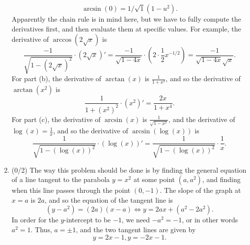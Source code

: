 \documentclass{article}
\begin{document}
\begin{enumerate}
		\[
			\operatorname{arcsin}(0) = 1/\sqrt{1} (1 - u^{2}).
		\]
		Apparently the chain rule is in mind here, but we have to fully compute the derivatives first, and then evaluate them at specific values. For example, the derivative of $\operatorname{arccos}(2 \sqrt{x})$ is 
		\[
			\frac{-1}{\sqrt{1 - (2 \sqrt{x})^{2}}} \cdot (2 \sqrt{x})' = \frac{-1}{\sqrt{1 - 4x}} \cdot (2 \cdot \frac{1}{2} x^{-1/2}) = \frac{-1}{\sqrt{1 - 4x}\sqrt{x}}.
		\]
		For part (b), the derivative of $\operatorname{arctan}(x)$ is $\frac{1}{1+x^{2}}$, and so the derivative of $\operatorname{arctan}(x^{2})$ is
		\[
			\frac{1}{1 + (x^{2})^{2}} \cdot (x^{2})' = \frac{2x}{1 + x^{4}}.
		\]
		For part (c), the derivative of $\operatorname{arcsin}(x)$ is $\frac{1}{\sqrt{1-x^{2}}}$, and the derivative of $\log(x) = \frac{1}{x}$, and so the derivative of $\operatorname{arcsin}(\log(x))$ is 
		\[
			\frac{1}{\sqrt{1 - (\log(x))^{2}}} \cdot (\log(x))' = \frac{1}{\sqrt{1 - (\log(x))^{2}}} \cdot \frac{1}{x}.
		\]
	\item (0/2) The way this problem should be done is by finding the general equation of a line tangent to the parabola $y = x^{2}$ at some point $(a, a^{2})$, and finding when this line passes through the point $(0, -1)$. The slope of the graph at $x = a$ is $2a$, and so the equation of the tangent line is
		\[
			(y - a^{2}) = (2a)(x-a) \Leftrightarrow y = 2ax + (a^{2} - 2a^{2}).
		\]
		In order for the $y$-intercept to be $-1$, we need $-a^{2} = -1$, or in other words $a^{2} = 1$. Thus, $a = \pm 1$, and the two tangent lines are given by
		\[
			y = 2x - 1, y = -2x -1.
		\]
\end{enumerate}
\end{document}
